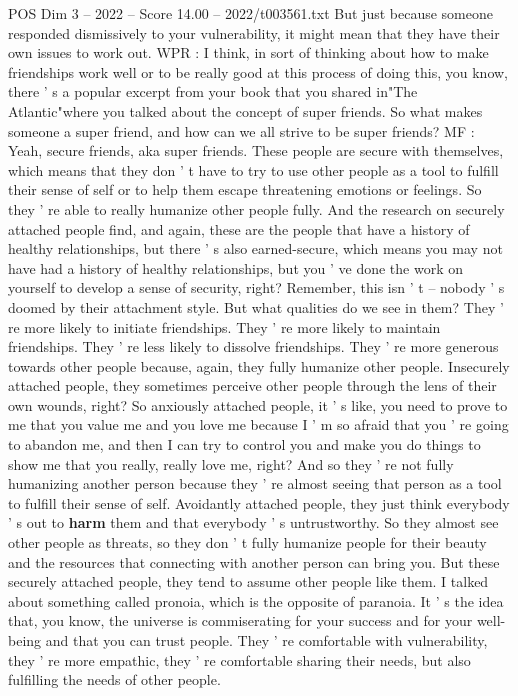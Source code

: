 \begin{textsample}{POS Dim 3 – 2022 – Score 14.00 – 2022/t003561.txt}
But just because someone responded dismissively to your vulnerability, it might mean that they have their own issues to work out.
WPR : I think, in sort of thinking about how to make friendships work well or to be really good at this process of doing this, you know, there ' s a popular excerpt from your book that you shared in"The Atlantic"where you talked about the concept of super friends.
So what makes someone a super friend, and how can we all strive to be super friends?
MF : Yeah, secure friends, aka super friends.
These people are secure with themselves, which means that they don ' t have to try to use other people as a tool to fulfill their sense of self or to help them escape threatening emotions or feelings.
So they ' re able to really humanize other people fully.
And the research on securely attached people find, and again, these are the people that have a history of healthy relationships, but there ' s also earned-secure, which means you may not have had a history of healthy relationships, but you ' ve done the work on yourself to develop a sense of security, right?
Remember, this isn ' t -- nobody ' s doomed by their attachment style.
But what qualities do we see in them?
They ' re more likely to initiate friendships.
They ' re more likely to maintain friendships.
They ' re less likely to dissolve friendships.
They ' re more generous towards other people because, again, they fully humanize other people.
Insecurely attached people, they sometimes perceive other people through the lens of their own wounds, right?
So anxiously attached people, it ' s like, you need to prove to me that you value me and you love me because I ' m so afraid that you ' re going to abandon me, and then I can try to control you and make you do things to show me that you really, really love me, right?
And so they ' re not fully humanizing another person because they ' re almost seeing that person as a tool to fulfill their sense of self.
Avoidantly attached people, they just think everybody ' s out to \textbf{harm} them and that everybody ' s untrustworthy.
So they almost see other people as threats, so they don ' t fully humanize people for their beauty and the resources that connecting with another person can bring you.
But these securely attached people, they tend to assume other people like them.
I talked about something called pronoia, which is the opposite of paranoia.
It ' s the idea that, you know, the universe is commiserating for your success and for your well-being and that you can trust people.
They ' re comfortable with vulnerability, they ' re more empathic, they ' re comfortable sharing their needs, but also fulfilling the needs of other people.

\end{textsample}
